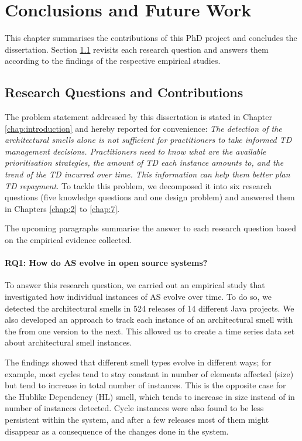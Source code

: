 \setlength{\headheight}{1.2cm}
\renewcommand{\publ}{\flushleft\footnotesize{}}

\chapter{Conclusions and Future Work}\label{chap:8}
This chapter summarises the contributions of this PhD project and concludes the dissertation.
Section \ref{c8:sec:rq-contributions} revisits each research question and answers them according to the findings of the respective empirical studies.

\section{Research Questions and Contributions}\label{c8:sec:rq-contributions}
The problem statement addressed by this dissertation is stated in Chapter \ref{chap:introduction} and hereby reported for convenience: \textit{The detection of the architectural smells alone is not sufficient for practitioners to take informed TD management decisions. Practitioners need to know what are the available prioritisation strategies, the amount of TD each instance amounts to, and the trend of the TD incurred over time. This information can help them better plan TD repayment.}
To tackle this problem, we decomposed it into six research questions (five knowledge questions and one design problem) and answered them in Chapters \ref{chap:2} to \ref{chap:7}.

The upcoming paragraphs summarise the answer to each research question based on the empirical evidence collected.

\subsubsection*{RQ1: How do AS evolve in open source systems?}
To answer this research question, we carried out an empirical study that investigated how individual instances of AS evolve over time.
To do so, we detected the architectural smells in 524 releases of 14 different Java projects. 
We also developed an approach to track each instance of an architectural smell with the from one version to the next.
This allowed us to create a time series data set about architectural smell instances.

The findings showed that different smell types evolve in different ways; for example, most cycles tend to stay constant in number of elements affected (size) but tend to increase in total number of instances.
This is the opposite case for the Hublike Dependency (HL) smell, which tends to increase in size instead of in number of instances detected.
Cycle instances were also found to be less persistent within the system, and after a few releases most of them might disappear as a consequence of the changes done in the system.

